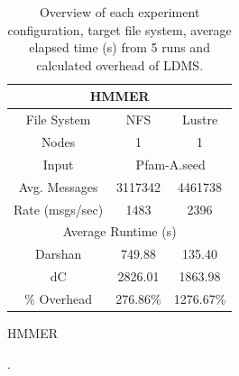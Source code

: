 \begin{table}[h]
\begin{subtable}[h]{0.5\textwidth}
    \end{subtable}
    \begin{subtable}[h]{0.5\textwidth}
        \centering
        \setlength\tabcolsep{19pt}
        \begin{tabular}{|cclcl|}
        \hline
        \multicolumn{5}{|c|}{HMMER}                                                                            \\ \hline
        \multicolumn{1}{|c|}{File System}     & \multicolumn{2}{c|}{NFS}      & \multicolumn{2}{c|}{Lustre}    \\ \hline
        \multicolumn{1}{|c|}{Nodes}           & \multicolumn{2}{c|}{1}        & \multicolumn{2}{c|}{1}         \\ \hline
        \multicolumn{1}{|c|}{Input}           & \multicolumn{4}{c|}{Pfam-A.seed}                               \\ \hline
        \multicolumn{1}{|c|}{Avg. Messages}   & \multicolumn{2}{c|}{3117342}  & \multicolumn{2}{c|}{4461738}   \\ \hline
        \multicolumn{1}{|c|}{Rate (msgs/sec)} & \multicolumn{2}{c|}{1483}     & \multicolumn{2}{c|}{2396}      \\ \hline
        \multicolumn{5}{|c|}{Average Runtime (s)}                                                              \\ \hline
        \multicolumn{1}{|c|}{Darshan}         & \multicolumn{2}{c|}{749.88}   & \multicolumn{2}{c|}{135.40}    \\ \hline
        \multicolumn{1}{|c|}{dC}              & \multicolumn{2}{c|}{2826.01}  & \multicolumn{2}{c|}{1863.98}   \\ \hline
        \multicolumn{1}{|c|}{\% Overhead}     & \multicolumn{2}{c|}{276.86\%} & \multicolumn{2}{c|}{1276.67\%} \\ \hline
        \end{tabular}
    \caption{HMMER} 
    \label{subtable:HMMER}
\end{subtable}

\caption{Overview of each experiment configuration, target file system, average elapsed time (s) from 5 runs and calculated overhead of LDMS.}
\label{table:apps}
\end{table}
.
